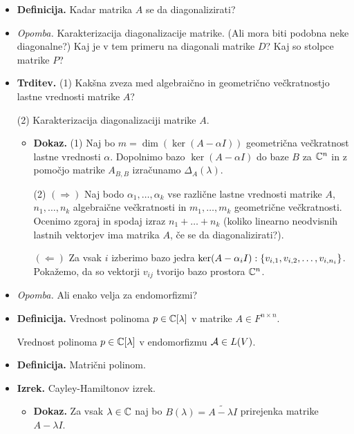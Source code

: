 \begin{enumerate}
\begin{itemize}
        \newpage
        \item \colorbox{purple!30}{\textbf{Definicija.}} Kadar matrika $A$ se da diagonalizirati?
        \item \colorbox{yellow!30}{\emph{Opomba.}} Karakterizacija diagonalizacije matrike. (Ali mora biti podobna neke diagonalne?) Kaj je v tem primeru na diagonali matrike $D$? Kaj so stolpce matrike $P$?
        \item \colorbox{blue!30}{\textbf{Trditev.}} (1) Kakšna zveza med algebraično in geometrično večkratnostjo lastne vrednosti matrike $A$?
        
        (2) Karakterizacija diagonalizaciji matrike $A$.        
        \begin{itemize}
            \item \colorbox{green!30}{\textbf{Dokaz.}} (1) Naj bo $m = \dim(\ker(A- \alpha I))$ geometrična večkratnost lastne vrednosti $\alpha$. Dopolnimo bazo $\ker(A- \alpha I)$ do baze $B$ za $\mathbb{C}^n$ in z pomočjo matrike $A_{B, B}$ izračunamo $\Delta_A(\lambda)$.
            
            (2) $(\Rightarrow)$ Naj bodo $\alpha_1, \ldots, \alpha_k$ vse različne lastne vrednosti matrike $A$, $n_1, \ldots, n_k$ algebraične večkratnosti in $m_1, \ldots, m_k$ geometrične večkratnosti. Ocenimo zgoraj in spodaj izraz $n_1 + \ldots + n_k$ (koliko linearno neodvisnih lastnih vektorjev ima matrika $A$, če se da diagonalizirati?).

            $(\Leftarrow)$ Za vsak $i$ izberimo bazo jedra $\ker(A - \alpha_i I): \left\{v_{i,1}, v_{i, 2}, \ldots, v_{i, n_i}\right\}$. Pokažemo, da so vektorji $v_{ij}$ tvorijo bazo prostora $\mathbb{C}^n$.
        \end{itemize}
        \item \colorbox{yellow!30}{\emph{Opomba.}} Ali enako velja za endomorfizmi?
        \item \colorbox{purple!30}{\textbf{Definicija.}} Vrednost polinoma $p \in \mathbb{C}[\lambda]$ v matrike $A \in F^{n \times n}$. 
        
        Vrednost polinoma $p \in \mathbb{C}[\lambda]$ v endomorfizmu $\mathcal{A} \in L(V)$.
        \item \colorbox{purple!30}{\textbf{Definicija.}} Matrični polinom.
        \item \colorbox{blue!30}{\textbf{Izrek.}} Cayley-Hamiltonov izrek.
        \begin{itemize}
            \item \colorbox{green!30}{\textbf{Dokaz.}} Za vsak $\lambda \in \mathbb{C}$ naj bo $B(\lambda) = \widetilde{A - \lambda I}$ prirejenka matrike $A - \lambda I$.
            

\end{itemize}
\end{itemize}
\end{enumerate}
